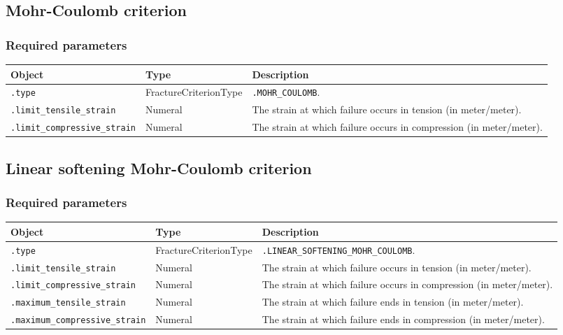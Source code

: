 \documentclass[10pt]{article}
\begin{document}
\subsection{Mohr-Coulomb criterion}

\subsubsection*{Required parameters}

\begin{tabularx}{\textwidth}{llX}
\hline 
Object & Type & Description \\ 
\hline 
\verb+.type+ & FractureCriterionType & \verb+.MOHR_COULOMB+. \\ 
\verb+.limit_tensile_strain+ & Numeral & The strain at which failure occurs in tension (in meter/meter).\\
\verb+.limit_compressive_strain+ & Numeral & The strain at which failure occurs in compression (in meter/meter).\\
\hline 
\end{tabularx}

\subsection{Linear softening Mohr-Coulomb criterion}

\subsubsection*{Required parameters}

\begin{tabularx}{\textwidth}{llX}
\hline 
Object & Type & Description \\ 
\hline 
\verb+.type+ & FractureCriterionType & \verb+.LINEAR_SOFTENING_MOHR_COULOMB+. \\ 
\verb+.limit_tensile_strain+ & Numeral & The strain at which failure occurs in tension (in meter/meter).\\
\verb+.limit_compressive_strain+ & Numeral & The strain at which failure occurs in compression (in meter/meter).\\
\verb+.maximum_tensile_strain+ & Numeral & The strain at which failure ends in tension (in meter/meter).\\
\verb+.maximum_compressive_strain+ & Numeral & The strain at which failure ends in compression (in meter/meter).\\
\hline 
\end{tabularx}
\end{document}
